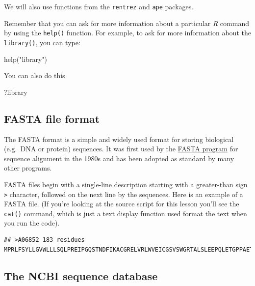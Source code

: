 \documentclass[
]{book}
\newenvironment{Shaded}{\begin{snugshade}}{\end{snugshade}}
\newcommand{\FunctionTok}[1]{\textcolor[rgb]{0.00,0.00,0.00}{#1}}
\newcommand{\NormalTok}[1]{#1}
\newcommand{\StringTok}[1]{\textcolor[rgb]{0.31,0.60,0.02}{#1}}
\begin{document}
We will also use functions from the \texttt{rentrez} and \texttt{ape} packages.

Remember that you can ask for more information about a particular \emph{R} command by using the \texttt{help()} function. For example, to ask for more information about the \texttt{library()}, you can type:

\begin{Shaded}
\begin{Highlighting}[]
\FunctionTok{help}\NormalTok{(}\StringTok{"library"}\NormalTok{)}
\end{Highlighting}
\end{Shaded}

You can also do this

\begin{Shaded}
\begin{Highlighting}[]
\NormalTok{?library}
\end{Highlighting}
\end{Shaded}

\hypertarget{fasta-file-format}{%
\subsection{FASTA file format}\label{fasta-file-format}}

The FASTA format is a simple and widely used format for storing biological (e.g.~DNA or protein) sequences. It was first used by the \href{https://en.wikipedia.org/wiki/FASTA}{FASTA program} for sequence alignment in the 1980s and has been adopted as standard by many other programs.

FASTA files begin with a single-line description starting with a greater-than sign \texttt{\textgreater{}} character, followed on the next line by the sequences. Here is an example of a FASTA file. (If you're looking at the source script for this lesson you'll see the \texttt{cat()} command, which is just a text display function used format the text when you run the code).

\begin{verbatim}
## >A06852 183 residues MPRLFSYLLGVWLLLSQLPREIPGQSTNDFIKACGRELVRLWVEICGSVSWGRTALSLEEPQLETGPPAETMPSSITKDAEILKMMLEFVPNLPQELKATLSERQPSLRELQQSASKDSNLNFEEFKKIILNRQNEAEDKSLLELKNLGLDKHSRKKRLFRMTLSEKCCQVGCIRKDIARLC
\end{verbatim}

\hypertarget{the-ncbi-sequence-database}{%
\subsection{The NCBI sequence database}\label{the-ncbi-sequence-database}}
\end{document}
